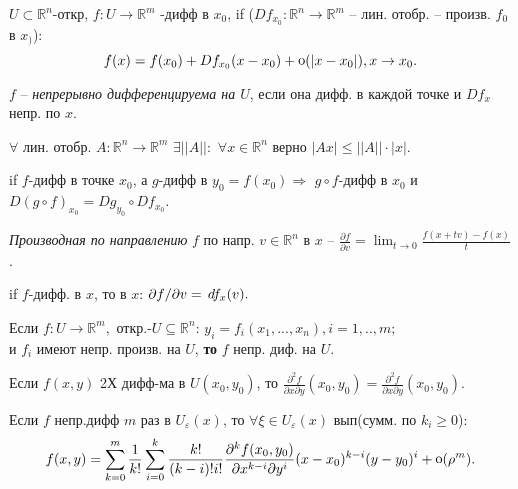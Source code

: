 
\begin{to_def}
	$U \subset \mathbb{R}^n$-откр, $f\colon U \to \mathbb{R}^m$ -дифф в $x_0$, if ($D f_{x_0}\colon \mathbb{R}^n \to \mathbb{R}^m$ -- лин. отобр. -- произв. $f_0$ в $x_)$):
	$$f(x) = f(x_0) + D f_{x_0}(x-x_0) + \mathop{\mathrm{o}}\nolimits (|x-x_0|), x \to x_0.$$
\end{to_def}

\begin{to_def}
	$f$ -- \textit{непрерывно дифференцируема на $U$}, если она дифф. в каждой точке и $D f_x$ непр. по $x$.
\end{to_def}	

\begin{to_lem}
	$\forall$ лин. отобр. $A \colon \mathbb{R}^n \to \mathbb{R}^m$ $\exists ||A||:$ $\forall x \in \mathbb{R}^n$ верно $|A x| \leq ||A|| \cdot |x|$.
	\label{6.3}
\end{to_lem}

\begin{to_thr}
	if $f$-дифф в точке $x_0$, а $g$-дифф в $y_0 = f(x_0) \Rightarrow$ $g \circ f$-дифф в $x_0$ и $D(g \circ f)_{x_0} = D g_{y_0} \circ D f_{x_0}$.
	\label{6.7}
\end{to_thr}

\begin{to_def}
	\textit{Производная по направлению} $f$ по напр. $v \in \mathbb{R}^n$ в $x$ -- $\frac{\partial f}{\partial v} = \lim_{t \to 0} \frac{f(x + t v) - f(x)}{t}$.
\end{to_def}

\begin{to_lem}
	if $f$-дифф. в $x$, то в $x$: $\partial f / \partial v = \, d f_x(v).$
	\label{6.9}
\end{to_lem}

\begin{to_thr}
	Если $f \colon U \to \mathbb{R}^m, $ откр.-$U \subseteq \mathbb{R}^n$: $y_i = f_i(x_1,...,x_n), i = 1,..,m$;\\
	и $f_i$ имеют непр. произв. на $U$, \textbf{то} $f$ непр. диф. на $U$.
	\label{6.10}
\end{to_thr}


\begin{to_lem}
	Если $f(x,y)$ 2Х дифф-ма в $U(x_0,y_0)$, то $\frac{\partial^2 f}{\partial x \partial y}(x_0, y_0) = \frac{\partial^2 f}{\partial x \partial y}(x_0, y_0).$
	\label{6.13}
\end{to_lem}


\begin{to_thr}
	Если $f$ непр.дифф $m$ раз в $U_\varepsilon(x)$, то $\forall \xi \in U_\varepsilon(x)$ вып(сумм. по $k_i \geq 0$):\\

	$$f(x, y) = \sum_{k=0}^m \frac{1}{k!} \sum_{i=0}^k \frac{k!}{(k-i)!i!} \frac{\partial^k f(x_0, y_0)}{\partial x^{k-i} \partial y^i} (x - x_0)^{k-i} (y - y_0)^i + \mathop{\mathrm{o}}\nolimits(\rho^m).$$
	\label{6.14}
\end{to_thr}